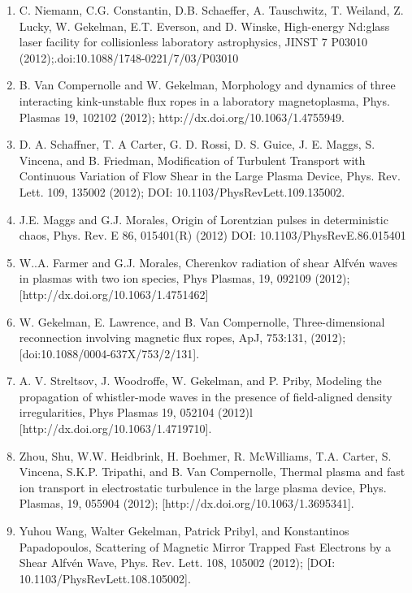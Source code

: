 \documentclass[11pt]{article}
\begin{document}
\begin{enumerate}
\item  C. Niemann, C.G. Constantin, D.B. Schaeffer, A. Tauschwitz, T. Weiland, Z. Lucky, W. Gekelman, E.T. Everson, and D. Winske, High-energy Nd:glass laser facility for collisionless laboratory astrophysics, JINST 7 P03010 (2012);.doi:10.1088/1748-0221/7/03/P03010

\item B. Van Compernolle and W. Gekelman, Morphology and dynamics of three interacting kink-unstable flux ropes in a laboratory magnetoplasma, Phys. Plasmas 19, 102102 (2012); http://dx.doi.org/10.1063/1.4755949.

\item D. A. Schaffner, T. A Carter, G. D. Rossi, D. S. Guice, J. E. Maggs, S. Vincena, and B. Friedman, Modification of Turbulent Transport with Continuous Variation of Flow Shear in the Large Plasma Device, Phys. Rev. Lett. 109, 135002 (2012); DOI: 10.1103/PhysRevLett.109.135002.

\item J.E. Maggs and G.J. Morales, Origin of Lorentzian pulses in deterministic chaos, Phys. Rev. E 86, 015401(R) (2012) DOI: 10.1103/PhysRevE.86.015401

\item  W..A. Farmer and G.J. Morales, Cherenkov radiation of shear Alfv\'{e}n waves in plasmas with two ion species, Phys Plasmas, 19, 092109 (2012); [http://dx.doi.org/10.1063/1.4751462]

\item  W. Gekelman, E. Lawrence, and B. Van Compernolle, Three-dimensional reconnection involving magnetic flux ropes, ApJ, 753:131, (2012); [doi:10.1088/0004-637X/753/2/131].

\item  A. V. Streltsov, J. Woodroffe, W. Gekelman, and P. Priby, Modeling the propagation of whistler-mode waves in the presence of field-aligned density irregularities, Phys Plasmas 19, 052104 (2012)l [http://dx.doi.org/10.1063/1.4719710].

\item  Zhou, Shu, W.W. Heidbrink, H. Boehmer, R. McWilliams, T.A. Carter, S. Vincena, S.K.P. Tripathi, and B. Van Compernolle, Thermal plasma and fast ion transport in electrostatic turbulence in the large plasma device, Phys. Plasmas, 19, 055904 (2012); [http://dx.doi.org/10.1063/1.3695341].

\item  Yuhou Wang, Walter Gekelman, Patrick Pribyl, and Konstantinos Papadopoulos, Scattering of Magnetic Mirror Trapped Fast Electrons by a Shear Alfv\'{e}n Wave, Phys. Rev. Lett. 108, 105002 (2012); [DOI: 10.1103/PhysRevLett.108.105002].


\end{enumerate}
\end{document}
